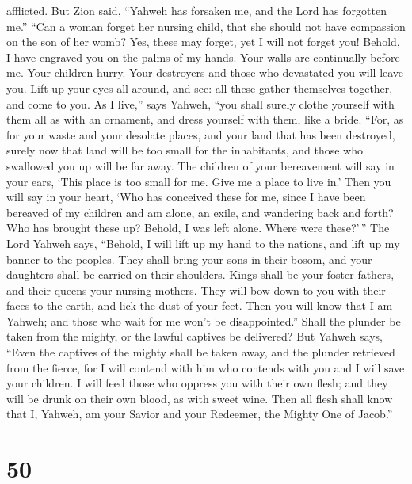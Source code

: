 afflicted.  But Zion said, ``Yahweh has forsaken me, and
the Lord has forgotten me.''  ``Can a woman forget her
nursing child, that she should not have compassion on the son of her
womb? Yes, these may forget, yet I will not forget you! 
Behold, I have engraved you on the palms of my hands. Your walls are
continually before me.  Your children hurry. Your
destroyers and those who devastated you will leave you. 
Lift up your eyes all around, and see: all these gather themselves
together, and come to you. As I live,'' says Yahweh, ``you shall surely
clothe yourself with them all as with an ornament, and dress yourself
with them, like a bride.  ``For, as for your waste and your
desolate places, and your land that has been destroyed, surely now that
land will be too small for the inhabitants, and those who swallowed you
up will be far away.  The children of your bereavement will
say in your ears, `This place is too small for me. Give me a place to
live in.'  Then you will say in your heart, `Who has
conceived these for me, since I have been bereaved of my children and am
alone, an exile, and wandering back and forth? Who has brought these up?
Behold, I was left alone. Where were these?'\,''  The Lord
Yahweh says, ``Behold, I will lift up my hand to the nations, and lift
up my banner to the peoples. They shall bring your sons in their bosom,
and your daughters shall be carried on their shoulders. 
Kings shall be your foster fathers, and their queens your nursing
mothers. They will bow down to you with their faces to the earth, and
lick the dust of your feet. Then you will know that I am Yahweh; and
those who wait for me won't be disappointed.''  Shall the
plunder be taken from the mighty, or the lawful captives be delivered?
 But Yahweh says, ``Even the captives of the mighty shall
be taken away, and the plunder retrieved from the fierce, for I will
contend with him who contends with you and I will save your children.
 I will feed those who oppress you with their own flesh;
and they will be drunk on their own blood, as with sweet wine. Then all
flesh shall know that I, Yahweh, am your Savior and your Redeemer, the
Mighty One of Jacob.''

\hypertarget{section-46}{%
\section{50}\label{section-46}}

